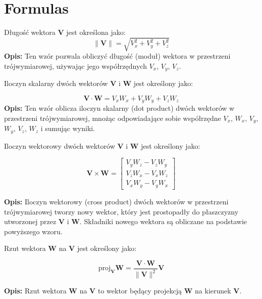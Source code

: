 \section{Formulas}


Długość wektora \( \mathbf{V} \) jest określona jako:
\[
\|\mathbf{V}\| = \sqrt{V_x^2 + V_y^2 + V_z^2}
\]
\textbf{Opis:} Ten wzór pozwala obliczyć długość (moduł) wektora w przestrzeni trójwymiarowej, używając jego współrzędnych \( V_x \), \( V_y \), \( V_z \).

\vspace{1em}
\noindent
Iloczyn skalarny dwóch wektorów \( \mathbf{V} \) i \( \mathbf{W} \) jest określony jako:

\[
\mathbf{V} \cdot \mathbf{W} = V_x W_x + V_y W_y + V_z W_z
\]
\noindent
\textbf{Opis:} Ten wzór oblicza iloczyn skalarny (dot product) dwóch wektorów w przestrzeni trójwymiarowej, mnożąc odpowiadające sobie współrzędne \( V_x \), \( W_x \), \( V_y \), \( W_y \), \( V_z \), \( W_z \) i sumując wyniki.


\vspace{1em}
\noindent
Iloczyn wektorowy dwóch wektorów \( \mathbf{V} \) i \( \mathbf{W} \) jest określony jako:

\[
\mathbf{V} \times \mathbf{W} = 
\begin{bmatrix}
V_y W_z - V_z W_y \\
V_z W_x - V_x W_z \\
V_x W_y - V_y W_x
\end{bmatrix}
\]

\vspace{1em}
\noindent
\textbf{Opis:} Iloczyn wektorowy (cross product) dwóch wektorów w przestrzeni trójwymiarowej tworzy nowy wektor, który jest prostopadły do płaszczyzny utworzonej przez \( \mathbf{V} \) i \( \mathbf{W} \). Składniki nowego wektora są obliczane na podstawie powyższego wzoru.



\vspace{1em}
\noindent
Rzut wektora \( \mathbf{W} \) na \( \mathbf{V} \) jest określony jako:

\[
\text{proj}_{\mathbf{V}} \mathbf{W} = \frac{\mathbf{V} \cdot \mathbf{W}}{\|\mathbf{V}\|^2} \mathbf{V}
\]

\vspace{1em}
\noindent
\textbf{Opis:} Rzut wektora \( \mathbf{W} \) na \( \mathbf{V} \) to wektor będący projekcją \( \mathbf{W} \) na kierunek \( \mathbf{V} \).

